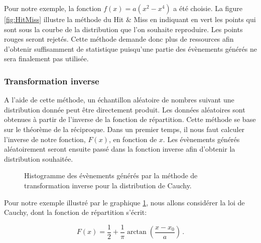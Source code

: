 Pour notre exemple, la fonction $f(x)=a(x^{2}-x^{4})$ a été choisie. La figure \ref{fig:HitMiss} illustre la méthode du Hit $\&$ Miss en indiquant en vert les points qui sont sous la courbe de la distribution que l'on souhaite reproduire. Les points rouges seront rejetés. Cette méthode demande donc plus de ressources afin d'obtenir suffisamment de statistique puisqu'une partie des évènements générés ne  sera finalement pas utilisée.

\subsubsection{Transformation inverse}
A l'aide de cette méthode,  un échantillon aléatoire de nombres suivant une distribution donnée peut être directement produit. Les données aléatoires sont obtenues à partir de l'inverse de la fonction de répartition. Cette méthode se base sur le théorème de la réciproque. Dans un premier temps, il nous faut calculer l'inverse de notre fonction, $F(x)$, en fonction de $x$. Les évènements générés aléatoirement seront ensuite passé dans la fonction inverse afin d'obtenir la distribution souhaitée. 

\begin{figure}[h!]
\caption{Histogramme des évènements générés par la méthode de transformation inverse pour la distribution de Cauchy.}
\label{fig:Inverse}
\end{figure}

Pour notre exemple illustré par le graphique \ref{fig:Inverse}, nous allons considérer la loi de Cauchy, dont la fonction de répartition s'écrit:

\begin{equation}
F(x) = \frac{1}{2} + \frac{1}{\pi} \arctan \left(\frac{x - x_{0}}{a}\right) \, .
\end{equation}

